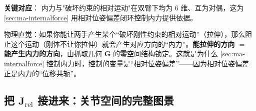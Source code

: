 \noindent\textbf{关键对应}：%
\noindent 内力与"破坏约束的相对运动"在双臂下均为 $6$ 维、互为对偶，这为 \cref{sec:ma-internalforce} 用相对位姿偏差闭环控制内力提供依据。

\begin{insight}[内力和相对运动是同一枚硬币的两面]
物理直觉：如果你能让两手产生某个“破坏刚性约束的相对运动”（拉伸），那么阻止这个运动（刚体不让你拉伸）就会产生对应方向的“内力”。\textbf{能拉伸的方向 $=$ 能产生内力的方向}，由抓取几何 $\mathbf{G}$ 的零空间结构锁定。这就是为什么 \cref{sec:ma-internalforce} 控制内力时，控制的变量是“相对位姿偏差”——因为相对位姿偏差正是内力的“位移共轭”。
\end{insight}

\subsection{把 \texorpdfstring{$\mathbf{J}_{\text{rel}}$}{J_rel} 接进来：关节空间的完整图景}
\label{sec:ma-jointpicture}

